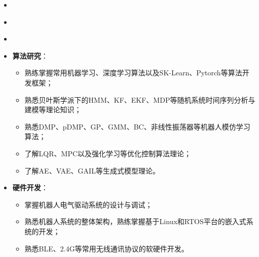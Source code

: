 \begin{itemize}[leftmargin=*]
  \item {}
\end{itemize}

\vspace{-1mm}
\begin{itemize}[leftmargin=*]
  \item {}
\end{itemize}

\vspace{-1mm}
\begin{itemize}[leftmargin=*]
  \item {}
\end{itemize}

\vspace{-1mm}
\begin{itemize}[leftmargin=*]
  \item \textbf{算法研究}：
  {\small
  \begin{itemize}
    \item 熟练掌握常用机器学习、深度学习算法以及SK-Learn、Pytorch等算法开发框架；
    \item 熟悉贝叶斯学派下的HMM、KF、EKF、MDP等随机系统时间序列分析与建模等理论知识；
    \item 熟悉DMP、pDMP、GP、GMM、BC、非线性振荡器等机器人模仿学习算法；
    \item 了解LQR、MPC以及强化学习等优化控制算法理论；
    \item 了解AE、VAE、GAIL等生成式模型理论。
  \end{itemize}}
\end{itemize}

\vspace{-3mm}
\begin{itemize}[leftmargin=*]
  \item \textbf{硬件开发}：
  {\small
  \begin{itemize}
    \item 掌握机器人电气驱动系统的设计与调试；
    \item 熟悉机器人系统的整体架构，熟练掌握基于Linux和RTOS平台的嵌入式系统的开发；
    \item 熟悉BLE、2.4G等常用无线通讯协议的软硬件开发。
  \end{itemize}}
\end{itemize}


